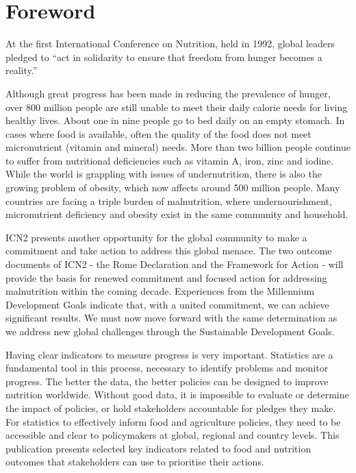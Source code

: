\section{Foreword}

\bigskip
\bigskip

\large


At the first International Conference on Nutrition, held in 1992, global leaders pledged to “act in solidarity to ensure that freedom from hunger becomes a reality.”

Although great progress has been made in reducing the prevalence of hunger, over 800 million people are still unable to meet their daily calorie needs for living healthy lives. About one in nine people go to bed daily on an empty stomach. In cases where food is available, often the quality of the food does not meet micronutrient (vitamin and mineral) needs. More than two billion people continue to suffer from nutritional deficiencies such as vitamin A, iron, zinc and iodine. While the world is grappling with issues of undernutrition, there is also the growing problem of obesity, which now affects around 500 million people. Many countries are facing a triple burden of malnutrition, where undernourishment, micronutrient deficiency and obesity exist in the same community and household. 

ICN2 presents another opportunity for the global community to make a commitment and take action to address this global menace. The two outcome documents of ICN2 - the Rome Declaration and the Framework for Action - will provide the basis for renewed commitment and focused action for addressing malnutrition within the coming decade. Experiences from the Millennium Development Goals indicate that, with a united commitment, we can achieve significant results. We must now move forward with the same determination as we address new global challenges through the Sustainable Development Goals.

Having clear indicators to measure progress is very important. Statistics are a fundamental tool in this process, necessary to identify problems and monitor progress. The better the data, the better policies can be designed to improve nutrition worldwide. Without good data, it is impossible to evaluate or determine the impact of policies, or hold stakeholders accountable for pledges they make. For statistics to effectively inform food and agriculture policies, they need to be accessible and clear to policymakers at global, regional and country levels. This publication presents selected key indicators related to food and nutrition outcomes that stakeholders can use to prioritise their actions.  


